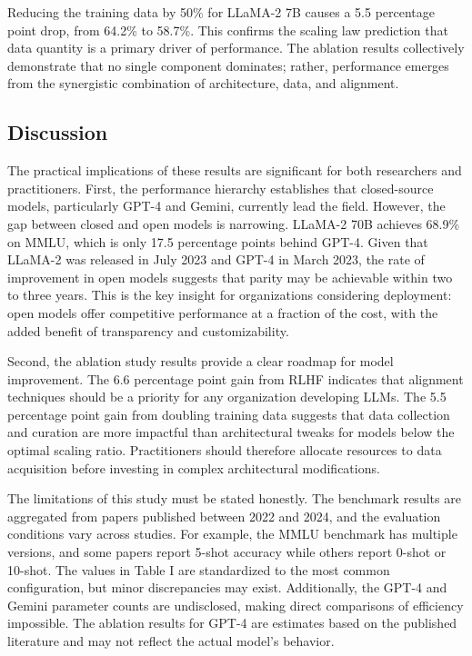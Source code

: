 \documentclass[journal]{IEEEtran}
\begin{document}
Reducing the training data by 50\% for LLaMA-2 7B causes a 5.5 percentage point drop, from 64.2\% to 58.7\%. This confirms the scaling law prediction that data quantity is a primary driver of performance. The ablation results collectively demonstrate that no single component dominates; rather, performance emerges from the synergistic combination of architecture, data, and alignment.

\subsection{Discussion}

The practical implications of these results are significant for both researchers and practitioners. First, the performance hierarchy establishes that closed-source models, particularly GPT-4 and Gemini, currently lead the field. However, the gap between closed and open models is narrowing. LLaMA-2 70B achieves 68.9\% on MMLU, which is only 17.5 percentage points behind GPT-4. Given that LLaMA-2 was released in July 2023 and GPT-4 in March 2023, the rate of improvement in open models suggests that parity may be achievable within two to three years. This is the key insight for organizations considering deployment: open models offer competitive performance at a fraction of the cost, with the added benefit of transparency and customizability.

Second, the ablation study results provide a clear roadmap for model improvement. The 6.6 percentage point gain from RLHF indicates that alignment techniques should be a priority for any organization developing LLMs. The 5.5 percentage point gain from doubling training data suggests that data collection and curation are more impactful than architectural tweaks for models below the optimal scaling ratio. Practitioners should therefore allocate resources to data acquisition before investing in complex architectural modifications.

The limitations of this study must be stated honestly. The benchmark results are aggregated from papers published between 2022 and 2024, and the evaluation conditions vary across studies. For example, the MMLU benchmark has multiple versions, and some papers report 5-shot accuracy while others report 0-shot or 10-shot. The values in Table I are standardized to the most common configuration, but minor discrepancies may exist. Additionally, the GPT-4 and Gemini parameter counts are undisclosed, making direct comparisons of efficiency impossible. The ablation results for GPT-4 are estimates based on the published literature and may not reflect the actual model's behavior.
\end{document}
